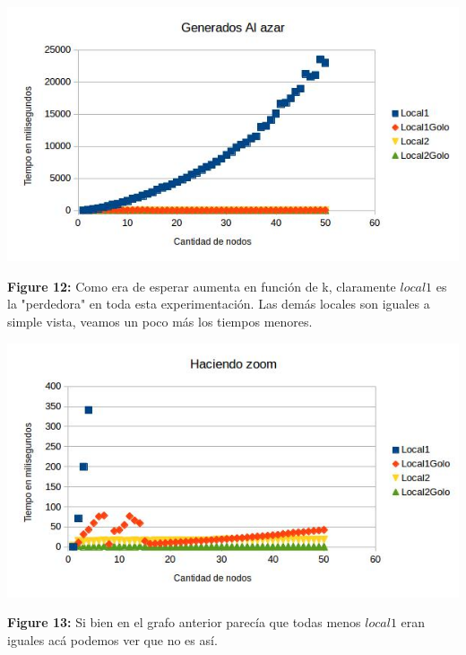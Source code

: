 \documentclass[a4paper]{article}
\begin{document}
\includegraphics[width=\textwidth,height=\textheight,keepaspectratio
]{N50K1-50.jpg}
\begin {flushleft}
\textbf{Figure 12:} Como era de esperar aumenta en función de k, claramente $local1$ es la "perdedora" en toda esta experimentación. Las demás locales son iguales a simple vista, veamos un poco más los tiempos menores.
\end{flushleft}

\includegraphics[width=\textwidth,height=\textheight,keepaspectratio
]{N50K1-50Zoom.jpg}
\begin {flushleft}
\textbf{Figure 13:} Si bien en el grafo anterior parecía que todas menos $local1$ eran iguales acá podemos ver que no es así.
\end{flushleft}
\end{document}
